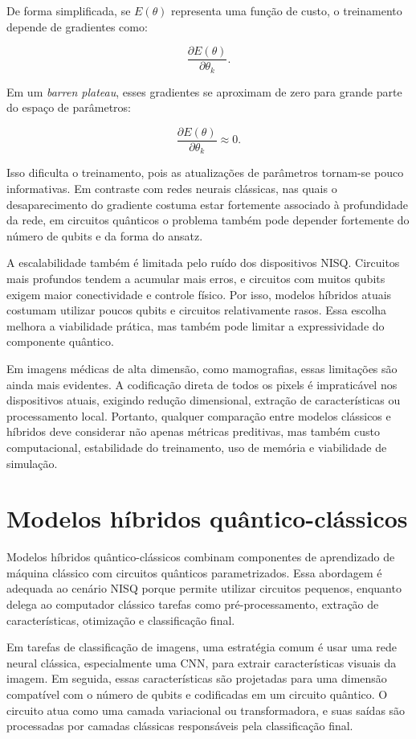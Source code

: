 \documentclass[
    12pt,
    openright,
    oneside,
    a4paper,
    english,
    brazil
]{abntex2}
\begin{document}
De forma simplificada, se \(E(\theta)\) representa uma função de custo, o treinamento depende de gradientes como:

\[
\frac{\partial E(\theta)}{\partial \theta_k}.
\]

Em um \textit{barren plateau}, esses gradientes se aproximam de zero para grande parte do espaço de parâmetros:

\[
\frac{\partial E(\theta)}{\partial \theta_k}
\approx 0.
\]

Isso dificulta o treinamento, pois as atualizações de parâmetros tornam-se pouco informativas. Em contraste com redes neurais clássicas, nas quais o desaparecimento do gradiente costuma estar fortemente associado à profundidade da rede, em circuitos quânticos o problema também pode depender fortemente do número de qubits e da forma do ansatz.

A escalabilidade também é limitada pelo ruído dos dispositivos NISQ. Circuitos mais profundos tendem a acumular mais erros, e circuitos com muitos qubits exigem maior conectividade e controle físico. Por isso, modelos híbridos atuais costumam utilizar poucos qubits e circuitos relativamente rasos. Essa escolha melhora a viabilidade prática, mas também pode limitar a expressividade do componente quântico.

Em imagens médicas de alta dimensão, como mamografias, essas limitações são ainda mais evidentes. A codificação direta de todos os pixels é impraticável nos dispositivos atuais, exigindo redução dimensional, extração de características ou processamento local. Portanto, qualquer comparação entre modelos clássicos e híbridos deve considerar não apenas métricas preditivas, mas também custo computacional, estabilidade do treinamento, uso de memória e viabilidade de simulação.


\section{Modelos híbridos quântico-clássicos}

Modelos híbridos quântico-clássicos combinam componentes de aprendizado de máquina clássico com circuitos quânticos parametrizados. Essa abordagem é adequada ao cenário NISQ porque permite utilizar circuitos pequenos, enquanto delega ao computador clássico tarefas como pré-processamento, extração de características, otimização e classificação final.

Em tarefas de classificação de imagens, uma estratégia comum é usar uma rede neural clássica, especialmente uma CNN, para extrair características visuais da imagem. Em seguida, essas características são projetadas para uma dimensão compatível com o número de qubits e codificadas em um circuito quântico. O circuito atua como uma camada variacional ou transformadora, e suas saídas são processadas por camadas clássicas responsáveis pela classificação final.
\end{document}
